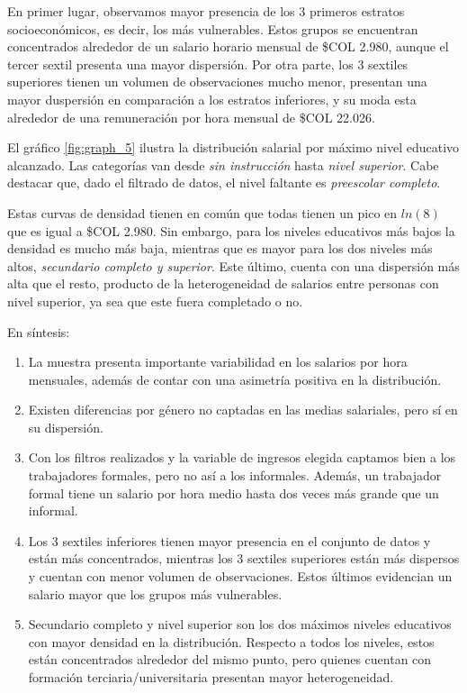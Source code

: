 \documentclass[11pt,oneside]{article}
\begin{document}
	En primer lugar, observamos mayor presencia de los 3 primeros estratos socioeconómicos, es decir, los más vulnerables. Estos grupos se encuentran concentrados alrededor de un salario horario mensual de \$COL 2.980, aunque el tercer sextil presenta una mayor dispersión. Por otra parte, los 3 sextiles superiores tienen un volumen de observaciones mucho menor, presentan una mayor duspersión en comparación a los estratos inferiores, y su moda esta alrededor de una remuneración por hora mensual de \$COL 22.026. 
	
	El gráfico \ref{fig:graph_5} ilustra la distribución salarial por máximo nivel educativo alcanzado. Las categorías van desde \textit{sin instrucción} hasta \textit{nivel superior}. Cabe destacar que, dado el filtrado de datos, el nivel faltante es \textit{preescolar completo}.
	
	Estas curvas de densidad tienen en común que todas tienen un pico en $ln(8)$ que es igual a \$COL 2.980. Sin embargo, para los niveles educativos más bajos la densidad es mucho más baja, mientras que es mayor para los dos niveles más altos, \textit{secundario completo y superior}. Este último, cuenta con una dispersión más alta que el resto, producto de la heterogeneidad de salarios entre personas con nivel superior, ya sea que este fuera completado o no. 
	
	En síntesis:
	\begin{enumerate}
		\item La muestra presenta importante variabilidad en los salarios por hora mensuales, además de contar con una asimetría positiva en la distribución.
		\item Existen diferencias por género no captadas en las medias salariales, pero sí en su dispersión.
		\item Con los filtros realizados y la variable de ingresos elegida captamos bien a los trabajadores formales, pero no así a los informales. Además, un trabajador formal tiene un salario por hora medio hasta dos veces más grande que un informal. 
		\item Los 3 sextiles inferiores tienen mayor presencia en el conjunto de datos y están más concentrados, mientras los 3 sextiles superiores están más dispersos y cuentan con menor volumen de observaciones. Estos últimos evidencian un salario mayor que los grupos más vulnerables.
		\item Secundario completo y nivel superior son los dos máximos niveles educativos con mayor densidad en la distribución. Respecto a todos los niveles, estos están concentrados alrededor del mismo punto, pero quienes cuentan con formación terciaria/universitaria presentan mayor heterogeneidad. 
	\end{enumerate}
	
\end{document}
